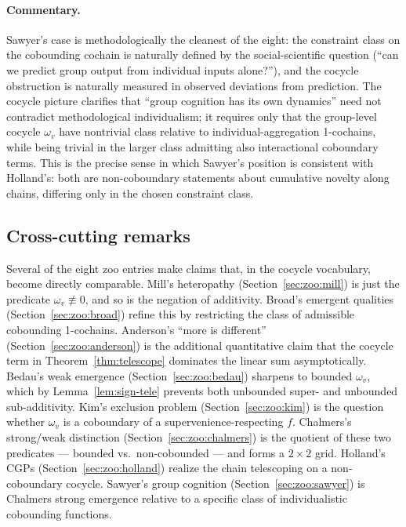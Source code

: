 \paragraph{Commentary.} Sawyer's case is methodologically the cleanest of
the eight: the constraint class on the cobounding cochain is naturally
defined by the social-scientific question (``can we predict group output
from individual inputs alone?''), and the cocycle obstruction is naturally
measured in observed deviations from prediction. The cocycle picture
clarifies that ``group cognition has its own dynamics'' need not contradict
methodological individualism; it requires only that the group-level cocycle
$\omega_v$ have nontrivial class relative to individual-aggregation
1-cochains, while being trivial in the larger class admitting also
interactional coboundary terms. This is the precise sense in which Sawyer's
position is consistent with Holland's: both are non-coboundary statements
about cumulative novelty along chains, differing only in the chosen
constraint class.

\subsection*{Cross-cutting remarks}\label{sec:zoo:cross}

Several of the eight zoo entries make claims that, in the cocycle
vocabulary, become directly comparable. Mill's heteropathy
(Section~\ref{sec:zoo:mill}) is just the predicate $\omega_v \not\equiv 0$,
and so is the negation of additivity. Broad's emergent qualities
(Section~\ref{sec:zoo:broad}) refine this by restricting the class of
admissible cobounding 1-cochains. Anderson's ``more is different''
(Section~\ref{sec:zoo:anderson}) is the additional quantitative claim that
the cocycle term in Theorem~\ref{thm:telescope} dominates the linear sum
asymptotically. Bedau's weak emergence (Section~\ref{sec:zoo:bedau})
sharpens to bounded $\omega_v$, which by Lemma~\ref{lem:sign-tele} prevents
both unbounded super- and unbounded sub-additivity. Kim's exclusion
problem (Section~\ref{sec:zoo:kim}) is the question whether $\omega_v$ is a
coboundary of a supervenience-respecting $f$. Chalmers's strong/weak
distinction (Section~\ref{sec:zoo:chalmers}) is the quotient of these two
predicates --- bounded vs.\ non-cobounded --- and forms a $2\times 2$ grid.
Holland's CGPs (Section~\ref{sec:zoo:holland}) realize the chain
telescoping on a non-coboundary cocycle. Sawyer's group cognition
(Section~\ref{sec:zoo:sawyer}) is Chalmers strong emergence relative to a
specific class of individualistic cobounding functions.

